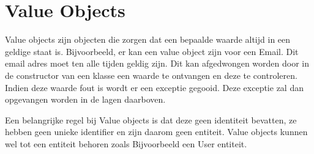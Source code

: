 
\section{Value Objects}
\label{sec:value-objects}

Value objects zijn objecten die zorgen dat een bepaalde waarde altijd in een geldige staat is. Bijvoorbeeld, er kan een value object zijn voor een Email. Dit email adres moet ten alle tijden geldig zijn. Dit kan afgedwongen worden door in de constructor van een klasse een waarde te ontvangen en deze te controleren. Indien deze waarde fout is wordt er een exceptie gegooid. Deze exceptie zal dan opgevangen worden in de lagen daarboven.

Een belangrijke regel bij Value objects is dat deze geen identiteit bevatten, ze hebben geen unieke identifier en zijn daarom geen entiteit. Value objects kunnen wel tot een entiteit behoren zoals Bijvoorbeeld een User entiteit.

